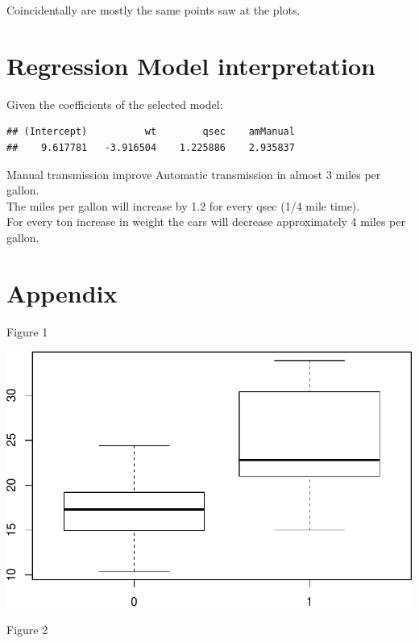 \documentclass[]{article}
\begin{document}
Coincidentally are mostly the same points saw at the plots.

\section{Regression Model
interpretation}\label{regression-model-interpretation}

Given the coefficients of the selected model:

\begin{verbatim}
## (Intercept)          wt        qsec    amManual 
##    9.617781   -3.916504    1.225886    2.935837
\end{verbatim}

Manual transmission improve Automatic transmission in almost 3 miles per
gallon.\\The miles per gallon will increase by 1.2 for every qsec (1/4
mile time).\\For every ton increase in weight the cars will decrease
approximately 4 miles per gallon.

\section{Appendix}\label{appendix}

Figure 1

\includegraphics{assigment_files/figure-latex/unnamed-chunk-11-1.pdf}

Figure 2
\end{document}
